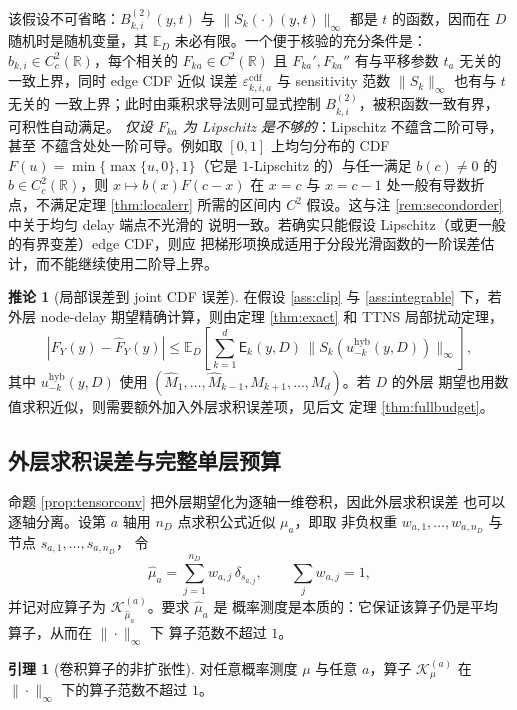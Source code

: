 \documentclass[a4paper,11pt]{article}
\theoremstyle{definition}
\newtheorem{lemma}{引理}
\newtheorem{corollary}{推论}
\newcommand{\R}{\mathbb R}
\newcommand{\E}{\mathbb E}
\newcommand{\1}{\mathbf 1}
\newcommand{\Eerr}{\mathsf E}
\newcommand{\ecdf}{\varepsilon^{\mathrm{cdf}}}
\begin{document}
该假设不可省略：$B_{k,i}^{(2)}(y,t)$ 与
$\|S_k(\cdot)(y,t)\|_\infty$ 都是 $t$ 的函数，因而在
$D$ 随机时是随机变量，其 $\E_D$ 未必有限。一个便于核验的充分条件是：
$b_{k,i}\in C_c^2(\R)$，每个相关的 $F_{ka}\in C^2(\R)$ 且
$F_{ka}',F_{ka}''$ 有与平移参数 $t_a$ 无关的一致上界，同时 edge CDF 近似
误差 $\ecdf_{k,i,a}$ 与 sensitivity 范数 $\|S_k\|_\infty$ 也有与 $t$ 无关的
一致上界；此时由乘积求导法则可显式控制
$B_{k,i}^{(2)}$，被积函数一致有界，可积性自动满足。
\emph{仅设 $F_{ka}$ 为 Lipschitz 是不够的}：Lipschitz 不蕴含二阶可导，甚至
不蕴含处处一阶可导。例如取 $[0,1]$ 上均匀分布的 CDF
$F(u)=\min\{\max\{u,0\},1\}$（它是 $1$-Lipschitz 的）与任一满足
$b(c)\neq0$ 的 $b\in C_c^2(\R)$，则 $x\mapsto b(x)F(c-x)$ 在 $x=c$ 与
$x=c-1$ 处一般有导数折点，不满足定理 \ref{thm:localerr} 所需的区间内
$C^2$ 假设。这与注 \ref{rem:secondorder} 中关于均匀 delay 端点不光滑的
说明一致。若确实只能假设 Lipschitz（或更一般的有界变差）edge CDF，则应
把梯形项换成适用于分段光滑函数的一阶误差估计，而不能继续使用二阶导上界。

\begin{corollary}[局部误差到 joint CDF 误差]
\label{cor:local2joint}
在假设 \ref{ass:clip} 与 \ref{ass:integrable} 下，若外层 node-delay
期望精确计算，则由定理 \ref{thm:exact} 和 TTNS 局部扰动定理，
\[
\left|
F_Y(y)-\widehat F_Y(y)
\right|
\le
\E_D
\left[
\sum_{k=1}^{d}
\Eerr_k(y,D)
\,
\|S_k(u_{-k}^{\mathrm{hyb}}(y,D))\|_\infty
\right],
\]
其中 $u_{-k}^{\mathrm{hyb}}(y,D)$ 使用
$(\widehat M_1,\ldots,\widehat M_{k-1},M_{k+1},\ldots,M_d)$。若 $D$ 的外层
期望也用数值求积近似，则需要额外加入外层求积误差项，见后文
定理 \ref{thm:fullbudget}。
\end{corollary}

\subsection{外层求积误差与完整单层预算}

命题 \ref{prop:tensorconv} 把外层期望化为逐轴一维卷积，因此外层求积误差
也可以逐轴分离。设第 $a$ 轴用 $n_D$ 点求积公式近似 $\mu_a$，即取
非负权重 $w_{a,1},\ldots,w_{a,n_D}$ 与节点 $s_{a,1},\ldots,s_{a,n_D}$，
令
\[
\widehat\mu_a=\sum_{j=1}^{n_D}w_{a,j}\,\delta_{s_{a,j}},
\qquad
\sum_{j}w_{a,j}=1,
\]
并记对应算子为 $\mathcal K_{\widehat\mu_a}^{(a)}$。要求 $\widehat\mu_a$ 是
概率测度是本质的：它保证该算子仍是平均算子，从而在 $\|\cdot\|_\infty$ 下
算子范数不超过 $1$。

\begin{lemma}[卷积算子的非扩张性]
\label{lem:nonexp}
对任意概率测度 $\mu$ 与任意 $a$，算子 $\mathcal K_\mu^{(a)}$ 在
$\|\cdot\|_\infty$ 下的算子范数不超过 $1$。
\end{lemma}
\end{document}
